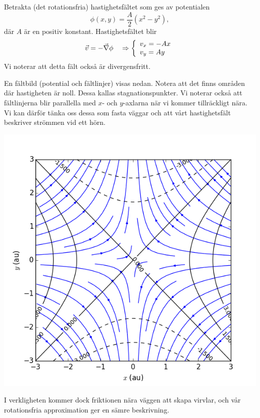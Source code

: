 \documentclass[%
oneside,                 %
final,                   %
10pt]{article}
\newenvironment{notice_mdfboxadmon}[1][]{
\begin{notice_mdfboxmdframed}[frametitle=#1]
}
{
\end{notice_mdfboxmdframed}
}
\begin{document}
\begin{notice_mdfboxadmon}

Betrakta (det rotationsfria) hastighetsfältet som ges av potentialen
$$
\phi(x,y) = \frac{A}{2}(x^2 - y^2),
$$
där $A$ är en positiv konstant. Hastighetsfältet blir
$$
\vec{v} = -\vec{\nabla} \phi \quad \Rightarrow 
\left\{
\begin{array}{l}
v_x = -A x \\
v_y = A y
\end{array}
\right.
$$
Vi noterar att detta fält också är divergensfritt. 

En fältbild (potential och fältlinjer) visas nedan. Notera att det finns områden där hastigheten är noll. Dessa kallas stagnationspunkter. Vi noterar också att fältlinjerna blir parallella med $x$- och $y$-axlarna när vi kommer tillräckligt nära. Vi kan därför tänka oss dessa som fasta väggar och att vårt hastighetsfält beskriver strömmen vid ett hörn.



\vspace{6mm}

\centerline{\includegraphics[width=0.8\linewidth]{fig/stagnation_fieldplot.png}}

\vspace{6mm}



I verkligheten kommer dock friktionen nära väggen att skapa virvlar, och vår rotationsfria approximation ger en sämre beskrivning.
\end{notice_mdfboxadmon} %
\end{document}
